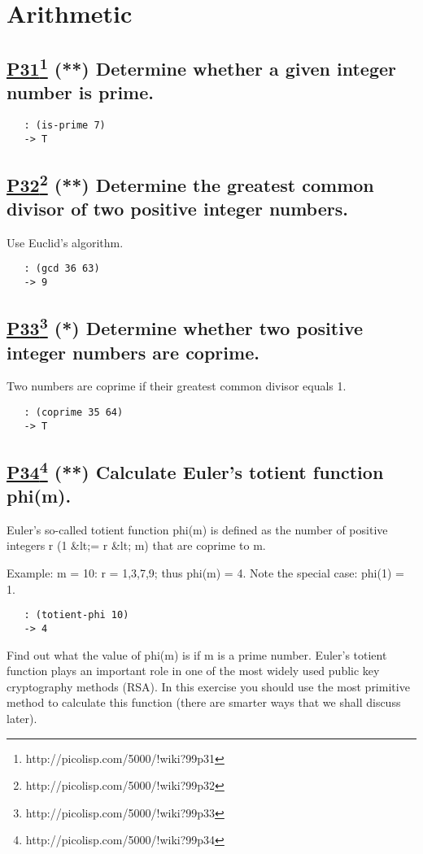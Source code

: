 \documentclass[10pt,a4paper]{article}
\begin{document}
\section*{Arithmetic}

\subsection*{\underline{P31}\footnote{http://picolisp.com/5000/!wiki?99p31} (**) Determine whether a given integer number is prime.}
\begin{verbatim}
   : (is-prime 7)
   -> T
\end{verbatim}


\subsection*{\underline{P32}\footnote{http://picolisp.com/5000/!wiki?99p32} (**) Determine the greatest common divisor of two positive integer
numbers.}
Use Euclid's algorithm.
\begin{verbatim}
   : (gcd 36 63)
   -> 9
\end{verbatim}


\subsection*{\underline{P33}\footnote{http://picolisp.com/5000/!wiki?99p33} (*) Determine whether two positive integer numbers are coprime.}
Two numbers are coprime if their greatest common divisor equals 1.
\begin{verbatim}
   : (coprime 35 64)
   -> T
\end{verbatim}


\subsection*{\underline{P34}\footnote{http://picolisp.com/5000/!wiki?99p34} (**) Calculate Euler's totient function phi(m).}
Euler's so-called totient function phi(m) is defined as the number
of positive integers r (1 \&lt;= r \&lt; m) that are coprime to m.

Example: m = 10: r = 1,3,7,9; thus phi(m) = 4.
Note the special case: phi(1) = 1.
\begin{verbatim}
   : (totient-phi 10)
   -> 4
\end{verbatim}

Find out what the value of phi(m) is if m is a prime number.
Euler's totient function plays an important role in one of the
most widely used public key cryptography methods (RSA). In this
exercise you should use the most primitive method to calculate
this function (there are smarter ways that we shall discuss later).
\end{document}
